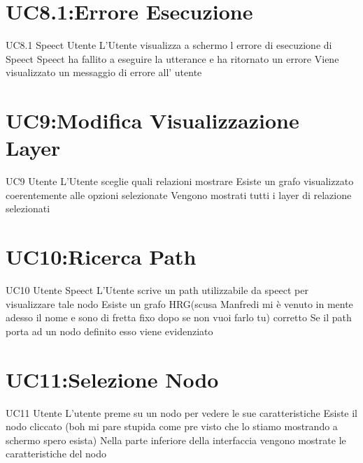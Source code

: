 \documentclass[../AnalisideiRequisiti.tex]{subfiles}
\begin{document}
\section{UC8.1:Errore Esecuzione}
\UserCase
{UC8.1}
{Speect}
{Utente}
{L'Utente visualizza a schermo l errore di esecuzione di Speect }
{Speect ha fallito a eseguire la utterance e ha ritornato un errore}
{Viene visualizzato un messaggio di errore all' utente}
{}
{}
\section{UC9:Modifica Visualizzazione Layer}
\UserCase
{UC9}
{Utente}
{}
{L'Utente sceglie quali relazioni mostrare}
{Esiste un grafo visualizzato coerentemente alle opzioni selezionate}
{Vengono mostrati tutti i layer di relazione selezionati}
{}
{}

\section{UC10:Ricerca Path}
\UserCase
{UC10}
{Utente}
{Speect}
{L'Utente scrive un path utilizzabile da speect per visualizzare tale nodo}
{Esiste un grafo HRG(scusa Manfredi mi è venuto in mente adesso il nome e sono di fretta fixo dopo se non vuoi farlo tu)
	corretto}
{Se il path porta ad un nodo definito esso viene evidenziato}
{}
{}

\section{UC11:Selezione Nodo}
\UserCase
{UC11}
{Utente}
{}
{L'utente preme su un nodo per vedere le sue caratteristiche}
{Esiste il nodo cliccato (boh mi pare stupida come pre visto che lo stiamo mostrando a schermo spero esista)}
{Nella parte inferiore della interfaccia vengono mostrate le caratteristiche del nodo}
{}
{}
\end{document}
